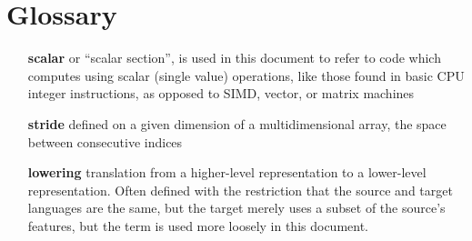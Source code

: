 \documentclass[acmsmall, nonacm=true]{acmart}
\begin{document}
\section*{Glossary}
\vspace{1em}
\begin{itemize}
\item[\textbf{scalar}]  {or ``scalar section'', is used in this document to refer to code which computes using scalar (single value) operations, like those found in basic CPU integer instructions, as opposed to SIMD, vector, or matrix machines}

\item[\textbf{stride}]  {defined on a given dimension of a multidimensional array, the space between consecutive indices}

\item[\textbf{lowering}] { translation from a higher-level representation to a lower-level representation. Often defined with the restriction that the source and target languages are the same, but the target merely uses a subset of the source's features, but the term is used more loosely in this document.}
\end{itemize}

\end{document}
